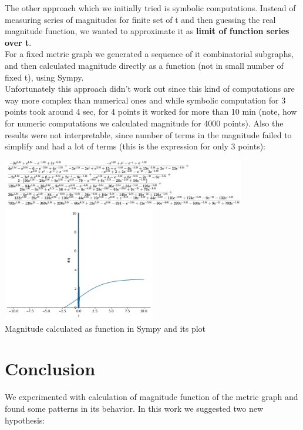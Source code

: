 \documentclass{article}
\begin{document}
The other approach which we initially tried is symbolic computations.
Instead of measuring series of magnitudes for finite set of t and then guessing the real magnitude function,
we wanted to approximate it as \textbf{limit of function series over t}. 
\\

For a fixed metric graph we generated a sequence of it combinatorial subgraphs,
and then calculated magnitude directly as a function (not in small number of fixed t), using 
Sympy. \\

Unfortunately this approach didn't work out since this kind of computations are
way more complex than numerical ones and while symbolic computation for 3 points took around 4 sec,
for 4 points it worked for more than 10 min (note, how for numeric computations
we calculated magnitude for 4000 points). Also the results were not interpretable,
since number of terms in the magnitude failed to simplify and had a lot of terms 
(this is the expression for only 3 points):

\begin{center}
\includegraphics[width=0.8\textwidth]{many_terms}
\includegraphics[width=0.5\textwidth]{func_plot} \\ Magnitude calculated as function in Sympy and its plot
\end{center}


\section{Conclusion}

We experimented with calculation of magnitude function of the metric graph and found 
some patterns in its behavior.
In this work we suggested two new hypothesis: 
\\
\end{document}
